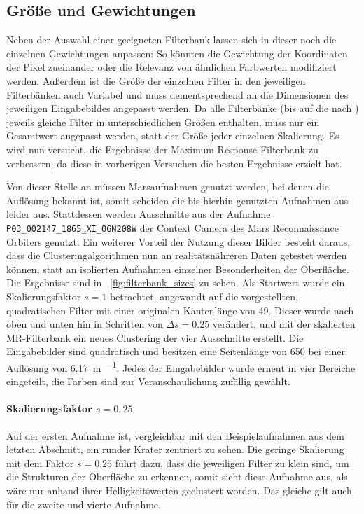 \subsection{Größe und Gewichtungen}

Neben der Auswahl einer geeigneten Filterbank lassen sich in dieser noch die einzelnen Gewichtungen anpassen: So könnten \zB die Gewichtung der Koordinaten der Pixel zueinander oder die Relevanz von ähnlichen Farbwerten modifiziert werden. Außerdem ist die Größe der einzelnen Filter in den jeweiligen Filterbänken auch Variabel und muss dementsprechend an die Dimensionen des jeweiligen Eingabebildes angepasst werden. Da alle Filterbänke (bis auf die nach \cite{jain_91}) jeweils gleiche Filter in unterschiedlichen Größen enthalten, muss nur ein Gesamtwert angepasst werden, statt der Größe jeder einzelnen Skalierung. Es wird nun versucht, die Ergebnisse der Maximum Response-Filterbank zu verbessern, da diese in vorherigen Versuchen die besten Ergebnisse erzielt hat.

Von dieser Stelle an müssen Marsaufnahmen genutzt werden, bei denen die Auflösung bekannt ist, somit scheiden die bis hierhin genutzten Aufnahmen aus \cite{greeley_13} leider aus. Stattdessen werden Ausschnitte aus der Aufnahme \texttt{P03\_002147\_1865\_XI\_06N208W} der Context Camera des Mars Reconnaissance Orbiters genutzt. Ein weiterer Vorteil der Nutzung dieser Bilder besteht daraus, dass die Clusteringalgorithmen nun an realitätsnähreren Daten getestet werden können, statt an isolierten Aufnahmen einzelner Besonderheiten der Oberfläche. Die Ergebnisse sind in \figurename~\ref{fig:filterbank_sizes} zu sehen. Als Startwert wurde ein Skalierungsfaktor $s=1$ betrachtet, angewandt auf die vorgestellten, quadratischen Filter mit einer originalen Kantenlänge von \SI{49}{\pixel}. Dieser wurde nach oben und unten hin in Schritten von $\Delta s=0.25$ verändert, und mit der skalierten MR-Filterbank ein neues Clustering der vier Ausschnitte erstellt. Die Eingabebilder sind quadratisch und besitzen eine Seitenlänge von \SI{650}{\pixel} bei einer Auflösung von \SI{6,17}{\meter\per\pixel}. Jedes der Eingabebilder wurde erneut in vier Bereiche eingeteilt, die Farben sind zur Veranschaulichung zufällig gewählt.

\paragraph{Skalierungsfaktor $s=0,25$}

Auf der ersten Aufnahme ist, vergleichbar mit den Beispielaufnahmen aus dem letzten Abschnitt, ein runder Krater zentriert zu sehen. Die geringe Skalierung mit dem Faktor $s=0.25$ führt dazu, dass die jeweiligen Filter zu klein sind, um die Strukturen der Oberfläche zu erkennen, somit sieht diese Aufnahme aus, als wäre nur anhand ihrer Helligkeitswerten geclustert worden. Das gleiche gilt auch für die zweite und vierte Aufnahme.

